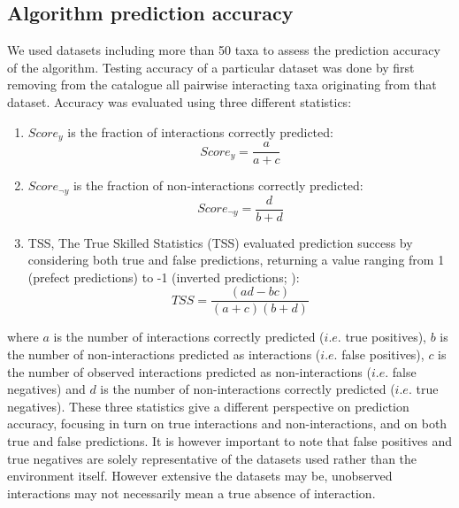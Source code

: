 \subsection{Algorithm prediction accuracy}
We used datasets including more than 50 taxa \citep{christian1999, link2002, thompson2004, brose2005, barnes2008, kortsch2015} to assess the prediction accuracy of the algorithm. Testing accuracy of a particular dataset was done by first removing from the catalogue all pairwise interacting taxa originating from that dataset. Accuracy was evaluated using three different statistics:

\begin{enumerate}
 \item $Score_y$ is the fraction of interactions correctly predicted:
     \begin{equation}
         Score_y = \frac{a}{a + c}
     \end{equation}

 \item $Score_{\neg y}$ is the fraction of non-interactions correctly predicted:
     \begin{equation}
       Score_{\neg y}  = \frac{d}{b + d}
     \end{equation}

 \item TSS, The True Skilled Statistics (TSS) evaluated prediction success by considering both true and false predictions, returning a value ranging from 1 (prefect predictions) to -1 (inverted predictions; \cite{allouche2006}):
     \begin{equation}
       TSS = \frac{(ad - bc)}{(a + c)(b + d)}
     \end{equation}
\end{enumerate}

where $a$ is the number of interactions correctly predicted ($i.e.$ true positives), $b$ is the number of non-interactions predicted as interactions ($i.e.$ false positives), $c$ is the number of observed interactions predicted as non-interactions ($i.e.$ false negatives) and $d$ is the number of non-interactions correctly predicted ($i.e.$ true negatives). These three statistics give a different perspective on prediction accuracy, focusing in turn on true interactions and non-interactions, and on both true and false predictions. It is however important to note that false positives and true negatives are solely representative of the datasets used rather than the environment itself. However extensive the datasets may be, unobserved interactions may not necessarily mean a true absence of interaction.

